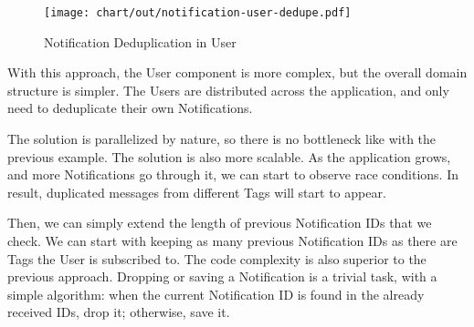 \begin{figure}[h]
  \centering
  \texttt{[image: chart/out/notification-user-dedupe.pdf]}
  \caption{Notification Deduplication in User}
  \label{fig:notification-user-dedupe}
\end{figure}

With this approach,
the User component is more complex,
but the overall domain structure is simpler.
The Users are distributed across the application,
and only need to deduplicate their own Notifications.

The solution is parallelized by nature,
so there is no bottleneck
like with the previous example.
The solution is also more scalable.
As the application grows,
and more Notifications go through it,
we can start to observe race conditions.
In result,
duplicated messages from different Tags
will start to appear.

Then, we can simply extend the length of
previous Notification \acp{ID} that we check.
We can start with keeping as many previous
Notification \acp{ID}
as there are Tags the User is subscribed to.
The code complexity is also superior
to the previous approach.
Dropping or saving a Notification is a trivial task,
with a simple algorithm:
when the current Notification \ac{ID} is found in the
already received \acp{ID}, drop it; otherwise, save it.
